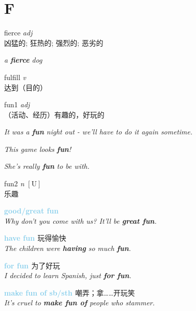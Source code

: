 \section{F}

\item[] {
    \lettrine{fierce}{}  
    \textit{adj} \\
    凶猛的; 狂热的; 强烈的; 恶劣的

    \textit{a \textbf{fierce} dog}
    
} 

\item[] {
    \lettrine{fulfill}{}  
    \textit{v} \\
    达到（目的）

}

\item[] {
    \lettrine{fun}{1}  
    \textit{adj} \\
    （活动、经历）有趣的，好玩的

    \textit{It was a \textbf{fun} night out - we'll have to do it again sometime.}

    \textit{This game looks \textbf{fun}!}

    \textit{She's really \textbf{fun} to be with.}
  
} 
\item[] {
    \lettrine{fun}{2}  
    \textit{n} 
    $\mathrm{[U]}$ \\
    乐趣

    \textbf {
        \textcolor{SkyBlue} {
            good/great fun
        }
    } \\
    \textit{Why don't you come with us? It'll be \textbf{great fun}.}

    \textbf {
        \textcolor{SkyBlue} {
            have fun
        }
    } 
    玩得愉快 \\
    \textit{The children were \textbf{having} so much \textbf{fun}.}

    \textbf {
        \textcolor{SkyBlue} {
            for fun
        }
    }  
    为了好玩 \\
    \textit{I decided to learn Spanish, just \textbf{for fun}.}
    
    \textbf {
        \textcolor{SkyBlue} {
            make \textprimstress fun of sb/sth
        }
    }  
    嘲弄；拿……开玩笑 \\
    \textit{It's cruel to \textbf{make fun of} people who stammer.}
} 
